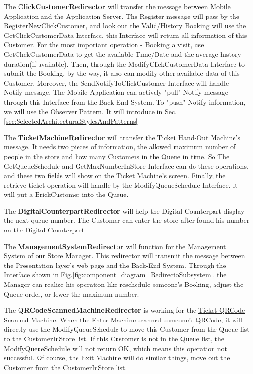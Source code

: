 \documentclass[a4paper,12pt]{report}
\begin{document}
The \textbf{ClickCustomerRedirector} will transfer the message between Mobile Application and the Application Server.
The Register message will pass by the RegisterNewClickCustomer, and look out the Valid/History Booking will use the GetClickCustomerData Interface,
this Interface will return all information of this Customer.
For the most important operation - Booking a visit, use GetClickCustomerData to get the available Time/Date and the average history duration(if available).
Then, through the ModifyClickCustomerData Interface to submit the Booking,
by the way, it also can modify other available data of this Customer.
Moreover, the SendNotifyToClickCustomer Interface will handle Notify message.
The Mobile Application can actively "pull" Notify message through this Interface from the Back-End System.
To "push" Notify information, we will use the Observer Pattern.
It will introduce in Sec.\ref{sec:SelectedArchitecturalStylesAndPatterns}

The \textbf{TicketMachineRedirector} will transfer the Ticket Hand-Out Machine's message.
It needs two pieces of information, the allowed \hyperref[subsec:definitions]{maximum number of people in the store} and how many Customers in the Queue in time.
So The GetQueueSchedule and GetMaxNumberInStore Interface can do these operations, and these two fields will show on the Ticket Machine's screen.
Finally, the retrieve ticket operation will handle by the ModifyQueueSchedule Interface.
It will put a BrickCustomer into the Queue.

The \textbf{DigitalCounterpartRedirector} will help the \hyperref[subsec:definitions]{Digital Counterpart} display the next queue number.
The Customer can enter the store after found his number on the Digital Counterpart.

The \textbf{ManagementSystemRedirector} will function for the Management System of our Store Manager.
This redirector will transmit the message between the Presentation layer's web page and the Back-End System.
Through the Interface shown in Fig.\ref{fig:component_diagram_RedirectoSubsystem}, the Manager can realize his operation like reschedule someone's Booking, adjust the Queue order, or lower the maximum number.

The \textbf{QRCodeScannedMachineRedirector} is working for the \hyperref[subsec:definitions]{Ticket QRCode Scanned Machine}.
When the Enter Machine scanned someone's QRCode, it will directly use the ModifyQueueSchedule to move this Customer from the Queue list to the CustomerInStore list.
If this Customer is not in the Queue list, the ModifyQueueSchedule will not return OK, which means this operation not successful.
Of course, the Exit Machine will do similar things, move out the Customer from the CustomerInStore list.
\end{document}
